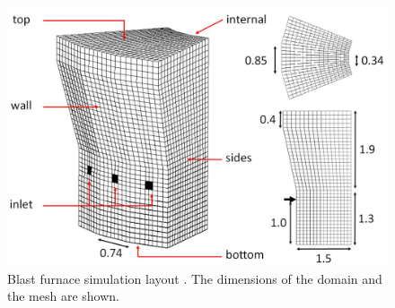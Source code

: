 \begin{figure}[!htb]
\centering
\includegraphics[width=.90\columnwidth]{images/273layoutbf}
\caption[Blast furnace simulation layout]{Blast furnace simulation layout
\cite{RefWorks:208}. The dimensions of the domain and the mesh are shown.}
\label{fig:273layoutbf}
\end{figure}